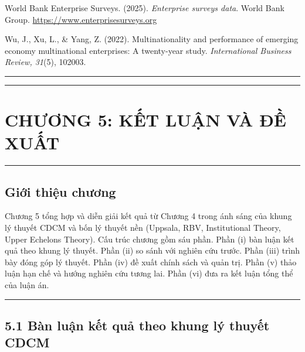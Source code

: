 \documentclass[12pt,a4paper]{article}
\begin{document}
World Bank Enterprise Surveys. (2025). \emph{Enterprise surveys data}.
World Bank Group. \url{https://www.enterprisesurveys.org}

Wu, J., Xu, L., \& Yang, Z. (2022). Multinationality and performance of
emerging economy multinational enterprises: A twenty-year study.
\emph{International Business Review, 31}(5), 102003.

\begin{center}\rule{0.5\linewidth}{0.5pt}\end{center}

\begin{center}\rule{0.5\linewidth}{0.5pt}\end{center}

\hypertarget{chux1b0ux1a1ng-5-kux1ebft-luux1eadn-vuxe0-ux111ux1ec1-xuux1ea5t}{%
\section{CHƯƠNG 5: KẾT LUẬN VÀ ĐỀ
XUẤT}\label{chux1b0ux1a1ng-5-kux1ebft-luux1eadn-vuxe0-ux111ux1ec1-xuux1ea5t}}

\begin{center}\rule{0.5\linewidth}{0.5pt}\end{center}

\hypertarget{giux1edbi-thiux1ec7u-chux1b0ux1a1ng-1}{%
\subsection{Giới thiệu
chương}\label{giux1edbi-thiux1ec7u-chux1b0ux1a1ng-1}}

Chương 5 tổng hợp và diễn giải kết quả từ Chương 4 trong ánh sáng của
khung lý thuyết CDCM và bốn lý thuyết nền (Uppsala, RBV, Institutional
Theory, Upper Echelons Theory). Cấu trúc chương gồm sáu phần. Phần (i)
bàn luận kết quả theo khung lý thuyết. Phần (ii) so sánh với nghiên cứu
trước. Phần (iii) trình bày đóng góp lý thuyết. Phần (iv) đề xuất chính
sách và quản trị. Phần (v) thảo luận hạn chế và hướng nghiên cứu tương
lai. Phần (vi) đưa ra kết luận tổng thể của luận án.

\begin{center}\rule{0.5\linewidth}{0.5pt}\end{center}

\hypertarget{51-buxe0n-luux1eadn-kux1ebft-quux1ea3-theo-khung-luxfd-thuyux1ebft-cdcm}{%
\subsection{5.1 Bàn luận kết quả theo khung lý thuyết
CDCM}\label{51-buxe0n-luux1eadn-kux1ebft-quux1ea3-theo-khung-luxfd-thuyux1ebft-cdcm}}
\end{document}
